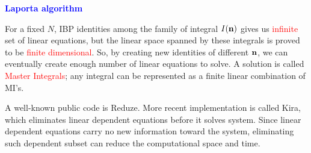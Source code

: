 \documentclass[10pt]{article}
\begin{document}
\textbf{\textcolor{blue}{Laporta algorithm}}

For a fixed $N$, IBP identities among the family of integral $I(\bold{n})$ gives us \textcolor{red}{infinite} set of linear equations, but the linear space spanned by these integrals is proved to be \textcolor{red}{finite dimensional}.
So, by creating new identities of different $\bold{n}$, we can eventually create enough number of linear equations to solve.
A solution is called \textcolor{red}{Master Integrals}; any integral can be represented as a finite linear combination of MI's.

A well-known public code is Reduze.
More recent implementation is called Kira, which eliminates linear dependent equations before it solves system.
Since linear dependent equations carry no new information toward the system, eliminating such dependent subset can reduce the computational space and time.
\end{document}
